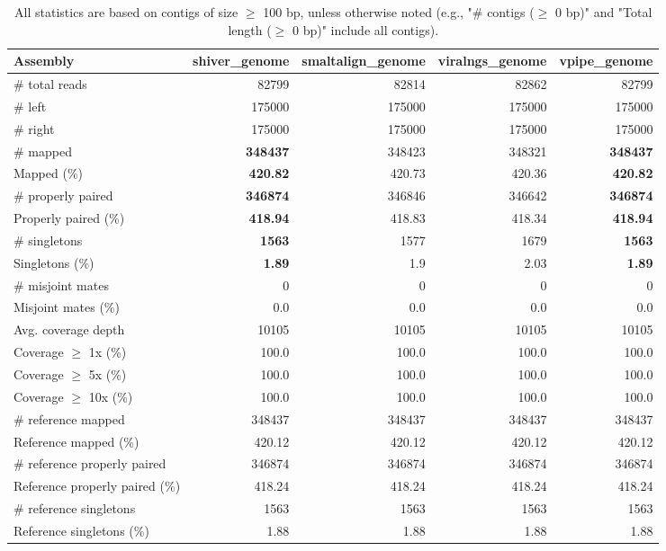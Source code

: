 \documentclass[12pt,a4paper]{article}
\begin{document}
\begin{table}[ht]
\begin{center}
\caption{All statistics are based on contigs of size $\geq$ 100 bp, unless otherwise noted (e.g., "\# contigs ($\geq$ 0 bp)" and "Total length ($\geq$ 0 bp)" include all contigs).}
\begin{tabular}{|l*{4}{|r}|}
\hline
Assembly & shiver\_genome & smaltalign\_genome & viralngs\_genome & vpipe\_genome \\ \hline
\# total reads & 82799 & 82814 & 82862 & 82799 \\ \hline
\# left & 175000 & 175000 & 175000 & 175000 \\ \hline
\# right & 175000 & 175000 & 175000 & 175000 \\ \hline
\# mapped & {\bf 348437} & 348423 & 348321 & {\bf 348437} \\ \hline
Mapped (\%) & {\bf 420.82} & 420.73 & 420.36 & {\bf 420.82} \\ \hline
\# properly paired & {\bf 346874} & 346846 & 346642 & {\bf 346874} \\ \hline
Properly paired (\%) & {\bf 418.94} & 418.83 & 418.34 & {\bf 418.94} \\ \hline
\# singletons & {\bf 1563} & 1577 & 1679 & {\bf 1563} \\ \hline
Singletons (\%) & {\bf 1.89} & 1.9 & 2.03 & {\bf 1.89} \\ \hline
\# misjoint mates & 0 & 0 & 0 & 0 \\ \hline
Misjoint mates (\%) & 0.0 & 0.0 & 0.0 & 0.0 \\ \hline
Avg. coverage depth & 10105 & 10105 & 10105 & 10105 \\ \hline
Coverage $\geq$ 1x (\%) & 100.0 & 100.0 & 100.0 & 100.0 \\ \hline
Coverage $\geq$ 5x (\%) & 100.0 & 100.0 & 100.0 & 100.0 \\ \hline
Coverage $\geq$ 10x (\%) & 100.0 & 100.0 & 100.0 & 100.0 \\ \hline
\# reference mapped & 348437 & 348437 & 348437 & 348437 \\ \hline
Reference mapped (\%) & 420.12 & 420.12 & 420.12 & 420.12 \\ \hline
\# reference properly paired & 346874 & 346874 & 346874 & 346874 \\ \hline
Reference properly paired (\%) & 418.24 & 418.24 & 418.24 & 418.24 \\ \hline
\# reference singletons & 1563 & 1563 & 1563 & 1563 \\ \hline
Reference singletons (\%) & 1.88 & 1.88 & 1.88 & 1.88 \\ \hline

\end{tabular}
\end{center}
\end{table}
\end{document}
